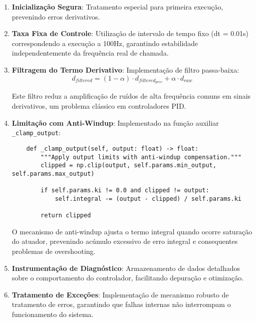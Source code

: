 \begin{enumerate}
    \item \textbf{Inicialização Segura}: Tratamento especial para primeira execução, prevenindo erros derivativos.

    \item \textbf{Taxa Fixa de Controle}: Utilização de intervalo de tempo fixo (dt = 0.01s) correspondendo a execução a 100Hz, garantindo estabilidade independentemente da frequência real de chamada.

    \item \textbf{Filtragem do Termo Derivativo}: Implementação de filtro passa-baixa:
          \begin{equation}
              d_{filtered} = (1 - \alpha) \cdot d_{filtered_{prev}} + \alpha \cdot d_{raw}
          \end{equation}

          Este filtro reduz a amplificação de ruídos de alta frequência comuns em sinais
          derivativos, um problema clássico em controladores PID.

    \item \textbf{Limitação com Anti-Windup}: Implementado na função auxiliar \texttt{\_clamp\_output}:
          \begin{verbatim}
    def _clamp_output(self, output: float) -> float:
        """Apply output limits with anti-windup compensation."""
        clipped = np.clip(output, self.params.min_output, self.params.max_output)
        
        if self.params.ki != 0.0 and clipped != output:
            self.integral -= (output - clipped) / self.params.ki
            
        return clipped
    \end{verbatim}

          O mecanismo de anti-windup ajusta o termo integral quando ocorre saturação do
          atuador, prevenindo acúmulo excessivo de erro integral e consequentes problemas
          de overshooting.

    \item \textbf{Instrumentação de Diagnóstico}: Armazenamento de dados detalhados sobre o comportamento do controlador, facilitando depuração e otimização.

    \item \textbf{Tratamento de Exceções}: Implementação de mecanismo robusto de tratamento de erros, garantindo que falhas internas não interrompam o funcionamento do sistema.
\end{enumerate}


